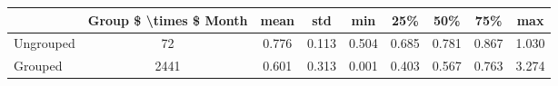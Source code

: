 \begin{tabular}{lcccccccc}
\toprule
{} &  Group \$ \textbackslash times \$ Month &   mean &    std &    min &    25\% &    50\% &    75\% &    max \\
\midrule
Ungrouped &                      72 &  0.776 &  0.113 &  0.504 &  0.685 &  0.781 &  0.867 &  1.030 \\
Grouped   &                    2441 &  0.601 &  0.313 &  0.001 &  0.403 &  0.567 &  0.763 &  3.274 \\
\bottomrule
\end{tabular}
